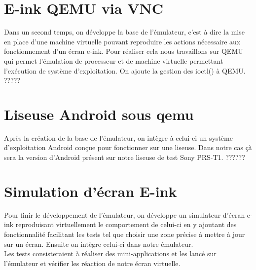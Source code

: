 \section{E-ink QEMU via VNC}

Dans un second temps, on développe la base de l'émulateur, c'est à dire la mise en place d'une machine virtuelle pouvant reproduire les actions nécessaire aux fonctionnement d'un écran e-ink. Pour réaliser cela nous travaillons sur QEMU qui permet l'émulation de processeur et de machine virtuelle permettant l'exécution de système d'exploitation. On ajoute la gestion des ioctl() à QEMU. ?????

\section{Liseuse Android sous qemu}

Après la création de la base de l'émulateur, on intègre à celui-ci un système d'exploitation Android conçue pour fonctionner sur une liseuse. Dans notre cas çà sera la version d'Android présent sur notre liseuse de test Sony PRS-T1. ??????

\section{Simulation d'écran E-ink}

Pour finir le développement de l'émulateur, on développe un simulateur d'écran e-ink reproduisant virtuellement le comportement de celui-ci en y ajoutant des fonctionnalité facilitant les tests tel que choisir une zone précise à mettre à jour sur un écran. Ensuite on intègre celui-ci dans notre émulateur.
\\Les tests consisteraient à réaliser des mini-applications et les lancé sur l'émulateur et vérifier les réaction de notre écran virtuelle.

